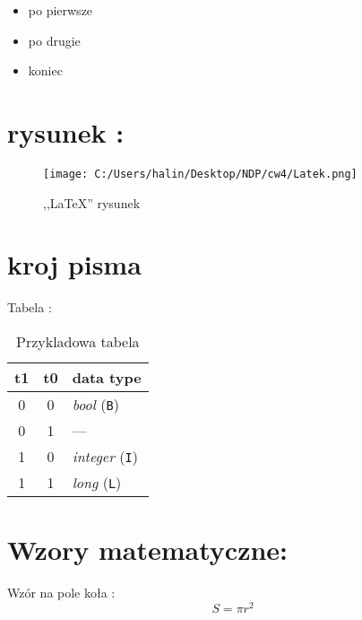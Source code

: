 \documentclass[a4paper,12pt]{scrbook}
\begin{document}
{\begin{itemize}
\subsection{Wypunktowania}
\item po pierwsze
\item po drugie
\item koniec
\end{itemize}

\section{rysunek :}

\begin{figure}[!htbp]
	
\texttt{[image: C:/Users/halin/Desktop/NDP/cw4/Latek.png]}

\begin{center}
\caption{,,\LaTeX'' rysunek} \label{rysunek}
\end{center}
\end{figure}
\clearpage

\section{kroj pisma}
\Large{Tabela :}

\begin{table}[!htbp]
\caption{Przykladowa tabela}
\label{tabela}
\centering

\vspace{3mm}
\begin{tabular}{|c c|l|} \hline
t1 & t0 & data type                 \\ \hline
 0 &  0 & {\em bool} (\verb$B$)     \\
 0 &  1 & ---                       \\
 1 &  0 & {\em integer} (\verb$I$)  \\
 1 &  1	& {\em long} (\verb$L$)     \\ \hline

\end{tabular}
\end{table}
 
 
\section{Wzory matematyczne:}
\large{Wzór na pole koła :}
\begin{equation}
S=\pi r^{2}
\end{equation}\newline

}
\end{document}
